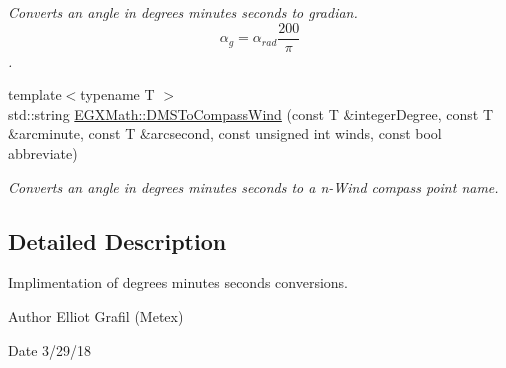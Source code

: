 \begin{DoxyCompactItemize}
\begin{DoxyCompactList}\small\item\em Converts an angle in degrees minutes seconds to gradian. \[\alpha_{g}=\alpha_{rad}\frac{200}{\pi}\]. \end{DoxyCompactList}\item 
{\footnotesize template$<$typename T $>$ }\\std\+::string \mbox{\hyperlink{group___e_g_x_math-_angle_conversions-_d_m_s_ga3beb450aec060ec6d4f0abae7eb7e503}{E\+G\+X\+Math\+::\+D\+M\+S\+To\+Compass\+Wind}} (const T \&integer\+Degree, const T \&arcminute, const T \&arcsecond, const unsigned int winds, const bool abbreviate)
\begin{DoxyCompactList}\small\item\em Converts an angle in degrees minutes seconds to a n-\/\+Wind compass point name. \end{DoxyCompactList}\end{DoxyCompactItemize}


\subsection{Detailed Description}
Implimentation of degrees minutes seconds conversions. 

\begin{DoxyAuthor}{Author}
Elliot Grafil (Metex) 
\end{DoxyAuthor}
\begin{DoxyDate}{Date}
3/29/18 
\end{DoxyDate}
